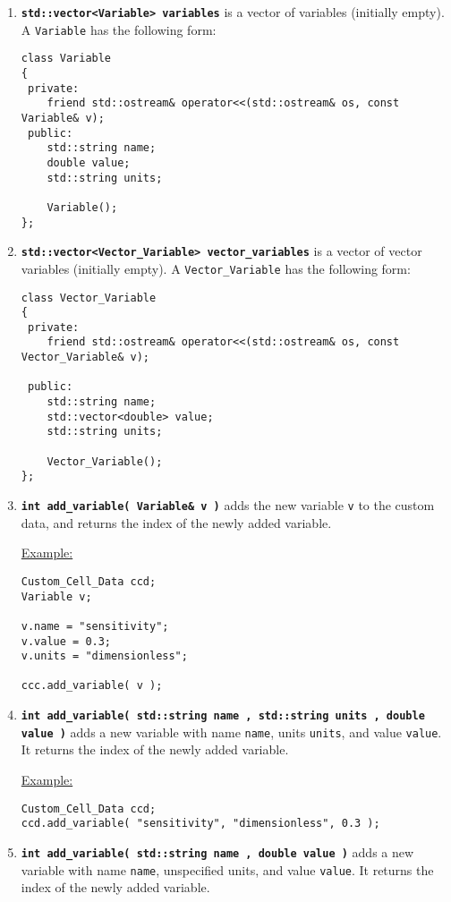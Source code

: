 \documentclass[12pt]{article}
\renewcommand{\v}{\verb}
\newcommand{\smallcode}[1]{\textbf{\texttt{#1}}}
\begin{document}
\begin{enumerate}
\item 
\smallcode{std::vector<Variable> variables} is a vector of variables (initially empty). A 
\v|Variable| has the following form: 

\begin{verbatim}
class Variable
{
 private:
    friend std::ostream& operator<<(std::ostream& os, const Variable& v);  
 public:
    std::string name; 
    double value; 
    std::string units; 
    
    Variable(); 
};
\end{verbatim}

\item 
\smallcode{std::vector<Vector\_Variable> vector\_variables} is a vector of vector variables (initially empty). A 
\v|Vector_Variable| has the following form: 

\begin{verbatim}
class Vector_Variable
{
 private:
    friend std::ostream& operator<<(std::ostream& os, const Vector_Variable& v);   
    
 public:
    std::string name; 
    std::vector<double> value; 
    std::string units; 
    
    Vector_Variable(); 
};
\end{verbatim}

\item 
\smallcode{int add\_variable( Variable\& v )} adds the new variable \v|v| to the 
custom data, and returns the index of the newly added variable. 

\underline{Example:}
\begin{verbatim}
Custom_Cell_Data ccd; 
Variable v; 

v.name = "sensitivity"; 
v.value = 0.3; 
v.units = "dimensionless"; 

ccc.add_variable( v ); 
\end{verbatim}

\item 
\smallcode{int add\_variable( std::string name , std::string units , double value )} 
adds a new variable with name \v|name|, units \v|units|, and value \v|value|. It 
returns the index of the newly added variable. 

\underline{Example:} 
\begin{verbatim}
Custom_Cell_Data ccd; 
ccd.add_variable( "sensitivity", "dimensionless", 0.3 ); 
\end{verbatim}

\item 
\smallcode{int add\_variable( std::string name , double value )}
adds a new variable with name \v|name|, unspecified units, and value \v|value|. It 
returns the index of the newly added variable. 
       

\end{enumerate}
\end{document}
